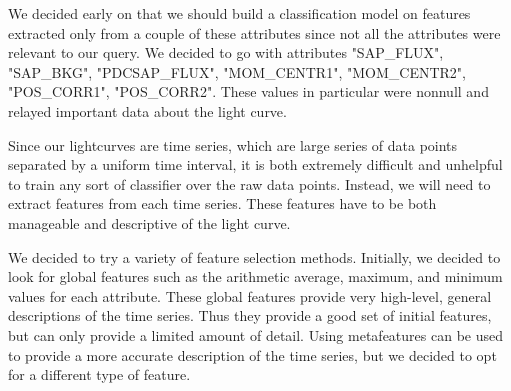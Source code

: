 \documentclass{amsart}
\begin{document}
We decided early on that we should build a classification model on features extracted only from a couple of these attributes since not all the attributes were relevant to our query. We decided to go with attributes "SAP\_FLUX", "SAP\_BKG", "PDCSAP\_FLUX", "MOM\_CENTR1", "MOM\_CENTR2", "POS\_CORR1", "POS\_CORR2". These values in particular were nonnull and relayed important data about the light curve. 

Since our lightcurves are time series, which are large series of data points separated by a uniform time interval, it is both extremely difficult and unhelpful to train any sort of classifier over the raw data points. Instead, we will need to extract features from each time series. These features have to be both manageable and descriptive of the light curve.


We decided to try a variety of feature selection methods. Initially, we decided to look for global features such as the arithmetic average, maximum, and minimum values for each attribute. These global features provide very high-level, general descriptions of the time series. Thus they provide a good set of initial features, but can only provide a limited amount of detail. Using metafeatures can be used to provide a more accurate description of the time series, but we decided to opt for a different type of feature.
\end{document}
